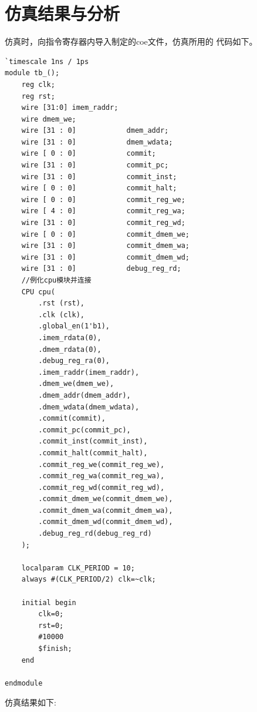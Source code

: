 \documentclass[12pt,a4paper]{ctexart}
\begin{document}
\section{仿真结果与分析}
仿真时，向指令寄存器内导入制定的coe文件，仿真所用的
代码如下。
\begin{lstlisting}[style=verilog]
`timescale 1ns / 1ps
module tb_();
    reg clk;
    reg rst;
    wire [31:0] imem_raddr;
    wire dmem_we;
    wire [31 : 0]            dmem_addr;
    wire [31 : 0]            dmem_wdata;
    wire [ 0 : 0]            commit;
    wire [31 : 0]            commit_pc;
    wire [31 : 0]            commit_inst;
    wire [ 0 : 0]            commit_halt;
    wire [ 0 : 0]            commit_reg_we;
    wire [ 4 : 0]            commit_reg_wa;
    wire [31 : 0]            commit_reg_wd;
    wire [ 0 : 0]            commit_dmem_we;
    wire [31 : 0]            commit_dmem_wa;
    wire [31 : 0]            commit_dmem_wd;
    wire [31 : 0]            debug_reg_rd;
    //例化cpu模块并连接
    CPU cpu(
        .rst (rst),
        .clk (clk),
        .global_en(1'b1),
        .imem_rdata(0),
        .dmem_rdata(0),
        .debug_reg_ra(0),
        .imem_raddr(imem_raddr),
        .dmem_we(dmem_we),
        .dmem_addr(dmem_addr),
        .dmem_wdata(dmem_wdata),
        .commit(commit),
        .commit_pc(commit_pc),
        .commit_inst(commit_inst),
        .commit_halt(commit_halt),
        .commit_reg_we(commit_reg_we),
        .commit_reg_wa(commit_reg_wa),
        .commit_reg_wd(commit_reg_wd),
        .commit_dmem_we(commit_dmem_we),
        .commit_dmem_wa(commit_dmem_wa),
        .commit_dmem_wd(commit_dmem_wd),
        .debug_reg_rd(debug_reg_rd)
    );
    
    localparam CLK_PERIOD = 10;
    always #(CLK_PERIOD/2) clk=~clk;
    
    initial begin
        clk=0;
        rst=0;
        #10000
        $finish;
    end
    
endmodule
\end{lstlisting}
仿真结果如下:
\end{document}
